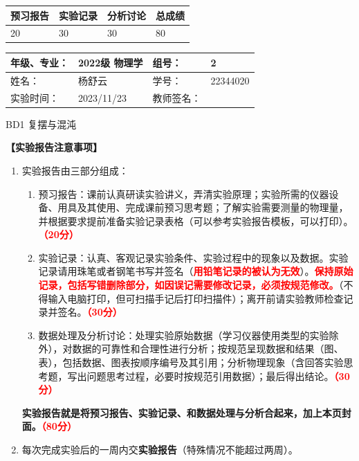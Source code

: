 \documentclass[dvipsnames, svgnames,a4paper,11pt]{article}
\begin{document}
	
	
	
	\begin{table}
		\renewcommand\arraystretch{1.7}
		\begin{tabularx}{\textwidth}{
				|X|X|X|X
				|X|X|X|X|}
			\hline
			\multicolumn{2}{|c|}{预习报告}&\multicolumn{2}{|c|}{实验记录}&\multicolumn{2}{|c|}{分析讨论}&\multicolumn{2}{|c|}{总成绩}\\
			\hline
			\LARGE20 & & \LARGE30 & & \LARGE30 & & \LARGE80 & \\
			\hline
		\end{tabularx}
	\end{table}
	
	\begin{table}
		\renewcommand\arraystretch{1.7}
		\begin{tabularx}{\textwidth}{|X|X|X|X|}
			\hline
			年级、专业： & 2022级 物理学 &组号： & 2\\
			\hline
			姓名： & 杨舒云  & 学号： & 22344020\\
			\hline
			实验时间： & 2023/11/23 & 教师签名： & \\
			\hline
		\end{tabularx}
	\end{table}
	
	\begin{center}
		\LARGE BD1 \quad 复摆与混沌
	\end{center}
	
	\textbf{【实验报告注意事项】}
	\begin{enumerate}
		\item 实验报告由三部分组成：
		\begin{enumerate}
			\item 预习报告：课前认真研读实验讲义，弄清实验原理；实验所需的仪器设备、用具及其使用、完成课前预习思考题；了解实验需要测量的物理量，并根据要求提前准备实验记录表格（可以参考实验报告模板，可以打印）。\textcolor{red}{\textbf{（20分）}}
			\item 实验记录：认真、客观记录实验条件、实验过程中的现象以及数据。实验记录请用珠笔或者钢笔书写并签名（\textcolor{red}{\textbf{用铅笔记录的被认为无效}}）。\textcolor{red}{\textbf{保持原始记录，包括写错删除部分，如因误记需要修改记录，必须按规范修改。}}（不得输入电脑打印，但可扫描手记后打印扫描件）；离开前请实验教师检查记录并签名。\textcolor{red}{\textbf{（30分）}}
			\item 数据处理及分析讨论：处理实验原始数据（学习仪器使用类型的实验除外），对数据的可靠性和合理性进行分析；按规范呈现数据和结果（图、表），包括数据、图表按顺序编号及其引用；分析物理现象（含回答实验思考题，写出问题思考过程，必要时按规范引用数据）；最后得出结论。\textcolor{red}{\textbf{（30分）}}
		\end{enumerate}
		\textbf{实验报告就是将预习报告、实验记录、和数据处理与分析合起来，加上本页封面。\textcolor{red}{（80分）}}
		\item 每次完成实验后的一周内交\textbf{实验报告}（特殊情况不能超过两周）。
	\end{enumerate}
	
\end{document}
